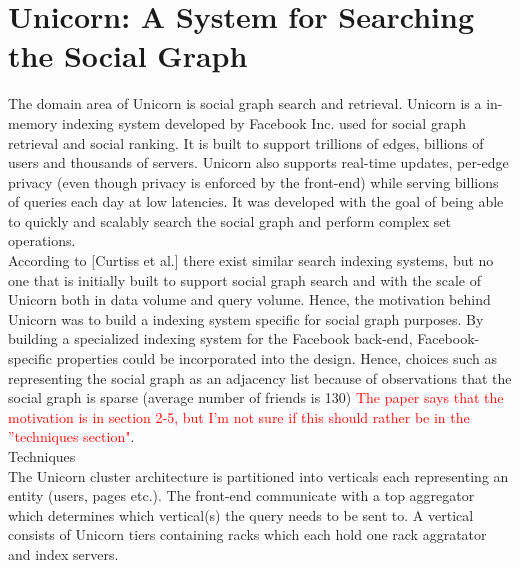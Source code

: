 \documentclass{article}
\begin{document}
\section*{Unicorn: A System for Searching the Social Graph}

The domain area of Unicorn is social graph search and retrieval. Unicorn is a in-memory indexing system developed by Facebook Inc. used for social graph retrieval and social ranking. It is built to support trillions of edges, billions of users and thousands of servers. Unicorn also supports real-time updates, per-edge privacy (even though privacy is enforced by the front-end) while serving billions of queries each day at low latencies. It was developed with the goal of being able to quickly and scalably search the social graph and perform complex set operations. \\

\noindent According to [Curtiss et al.] there exist similar search indexing systems, but no one that is initially built to support social graph search and with the scale of Unicorn both in data volume and query volume. Hence, the motivation behind Unicorn was to build a indexing system specific for social graph purposes. By building a specialized indexing system for the Facebook back-end, Facebook-specific properties could be incorporated into the design. Hence, choices such as representing the social graph as an adjacency list because of observations that the social graph is sparse (average number of friends is 130) \textcolor{red}{The paper says that the motivation is in section 2-5, but I'm not sure if this should rather be in the ''techniques section"}.\\

\noindent Techniques\\ 
The Unicorn cluster architecture is partitioned into verticals each representing an entity (users, pages etc.). The front-end communicate with a top aggregator which determines which vertical(s) the query needs to be sent to. A vertical consists of Unicorn tiers containing racks which each hold one rack aggratator and index servers. \\


% 
\end{document}
